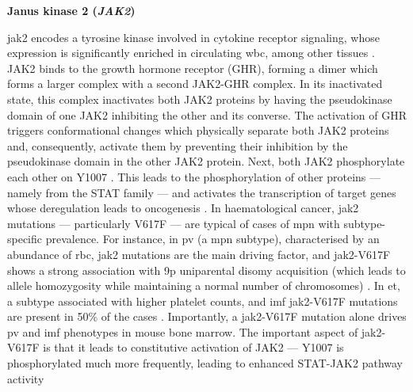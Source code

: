 \noindent \textbf{Janus kinase 2 (\textit{JAK2})}

\Ac{jak2} encodes a tyrosine kinase involved in cytokine receptor signaling, whose expression is significantly enriched in circulating \ac{wbc}, among other tissues \cite{Saltzman1998-wi}. JAK2 binds to the growth hormone receptor (GHR), forming a dimer which forms a larger complex with a second JAK2-GHR complex. In its inactivated state, this complex inactivates both JAK2 proteins by having the pseudokinase domain of one JAK2 inhibiting the other and its converse. The activation of GHR triggers conformational changes which physically separate both JAK2 proteins and, consequently, activate them by preventing their inhibition by the pseudokinase domain in the other JAK2 protein. Next, both JAK2 phosphorylate each other on Y1007 \cite{Brooks2014-fh}. This leads to the phosphorylation of other proteins --- namely from the STAT family --- and activates the transcription of target genes whose deregulation leads to oncogenesis \cite{Brooks2010-dc}. In haematological cancer, \ac{jak2} mutations --- particularly V617F --- are typical of cases of \ac{mpn} with subtype-specific prevalence. For instance, in \ac{pv} (a \ac{mpn} subtype), characterised by an abundance of \ac{rbc}, \ac{jak2} mutations are the main driving factor, and \ac{jak2}-V617F shows a strong association with 9p uniparental disomy acquisition (which leads to allele homozygosity while maintaining a normal number of chromosomes) \cite{Wang2014-qz}. In \ac{et}, a subtype associated with higher platelet counts, and \ac{imf} \ac{jak2}-V617F mutations are present in 50\% of the cases \cite{Constantinescu2008-cf}. Importantly, a \ac{jak2}-V617F mutation alone drives \ac{pv} and \ac{imf} phenotypes in mouse bone marrow. The important aspect of \ac{jak2}-V617F is that it leads to constitutive activation of JAK2 --- Y1007 is phosphorylated much more frequently, leading to enhanced STAT-JAK2 pathway activity \cite{Feng1997-jr,Constantinescu2008-cf}

